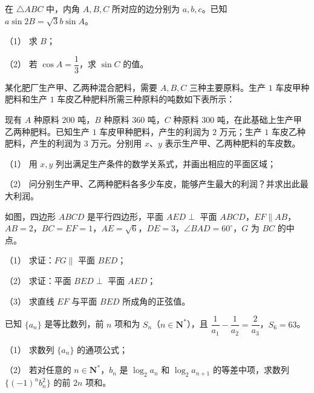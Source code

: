 \begin{question}
在 \(\triangle ABC\) 中，内角 \(A,B,C\) 所对应的边分别为 \(a,b,c\)。已知 \(a\sin 2B=\sqrt{3}b\sin A\)。

（1） 求 \(B\)；

（2） 若 \(\cos A=\dfrac{1}{3}\)，求 \(\sin C\) 的值。

\Needspace{0.4\textheight}
\end{question}
\begin{question}
某化肥厂生产甲、乙两种混合肥料，需要 \(A,B,C\) 三种主要原料。生产 \(1\) 车皮甲种肥料和生产 \(1\) 车皮乙种肥料所需三种原料的吨数如下表所示：
\nopagebreak[4]
\begin{center}\end{center}
\nopagebreak[4]
现有 \(A\) 种原料 \(200\) 吨，\(B\) 种原料 \(360\) 吨，\(C\) 种原料 \(300\) 吨，在此基础上生产甲乙两种肥料。已知生产 \(1\) 车皮甲种肥料，产生的利润为 \(2\) 万元；生产 \(1\) 车皮乙种肥料，产生的利润为 \(3\) 万元。分别用 \(x\)、\(y\) 表示生产甲、乙两种肥料的车皮数。

（1） 用 \(x,y\) 列出满足生产条件的数学关系式，并画出相应的平面区域；

（2） 问分别生产甲、乙两种肥料各多少车皮，能够产生最大的利润？并求出此最大利润。

\Needspace{0.4\textheight}
\end{question}
\begin{question}
如图，四边形 \(ABCD\) 是平行四边形，平面 \(AED\perp\) 平面 \(ABCD\)，\(EF\parallel AB\)，\(AB=2\)，\(BC=EF=1\)，\(AE=\sqrt{6}\)，\(DE=3\)，\(\angle BAD=60^{\circ}\)，\(G\) 为 \(BC\) 的中点。
\nopagebreak[4]
\begin{center}\end{center}
\nopagebreak[4]
（1） 求证：\(FG\parallel\) 平面 \(BED\)；

（2） 求证：平面 \(BED\perp\) 平面 \(AED\)；

（3） 求直线 \(EF\) 与平面 \(BED\) 所成角的正弦值。

\end{question}
\begin{question}
已知 \(\{a_{n}\}\) 是等比数列，前 \(n\) 项和为 \(S_{n}\)（\(n\in\mathbf{N}^{*}\)），且 \(\dfrac{1}{a_{1}}-\dfrac{1}{a_{2}}=\dfrac{2}{a_{3}}\)，\(S_{6}=63\)。

（1） 求数列 \(\{a_{n}\}\) 的通项公式；

（2） 若对任意的 \(n\in\mathbf{N}^{*}\)，\(b_{n}\) 是 \(\log_{2}a_{n}\) 和 \(\log_{2}a_{n+1}\) 的等差中项，求数列 \(\{(-1)^{n}b_{n}^{2}\}\) 的前 \(2n\) 项和。

\end{question}
